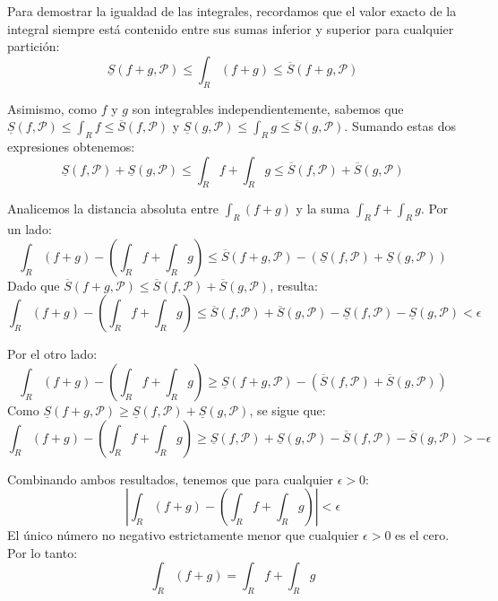 \documentclass[11pt,letterpaper]{article}
\begin{document}
Para demostrar la igualdad de las integrales, recordamos que el valor exacto de la integral siempre está contenido entre sus sumas inferior y superior para cualquier partición:
\begin{equation*}
\underline{S}(f+g,\mathcal{P}) \le \int_{R}(f+g) \le \overline{S}(f+g,\mathcal{P})
\end{equation*}

Asimismo, como $f$ y $g$ son integrables independientemente, sabemos que $\underline{S}(f,\mathcal{P}) \le \int_{R}f \le \overline{S}(f,\mathcal{P})$ y $\underline{S}(g,\mathcal{P}) \le \int_{R}g \le \overline{S}(g,\mathcal{P})$. Sumando estas dos expresiones obtenemos:
\begin{equation*}
\underline{S}(f,\mathcal{P}) + \underline{S}(g,\mathcal{P}) \le \int_{R}f + \int_{R}g \le \overline{S}(f,\mathcal{P}) + \overline{S}(g,\mathcal{P})
\end{equation*}

Analicemos la distancia absoluta entre $\int_{R}(f+g)$ y la suma $\int_{R}f + \int_{R}g$. 
Por un lado:
\begin{equation*}
\int_{R}(f+g) - \left(\int_{R}f + \int_{R}g\right) \le \overline{S}(f+g,\mathcal{P}) - (\underline{S}(f,\mathcal{P}) + \underline{S}(g,\mathcal{P}))
\end{equation*}
Dado que $\overline{S}(f+g,\mathcal{P}) \le \overline{S}(f,\mathcal{P}) + \overline{S}(g,\mathcal{P})$, resulta:
\begin{equation*}
\int_{R}(f+g) - \left(\int_{R}f + \int_{R}g\right) \le \overline{S}(f,\mathcal{P}) + \overline{S}(g,\mathcal{P}) - \underline{S}(f,\mathcal{P}) - \underline{S}(g,\mathcal{P}) < \epsilon
\end{equation*}

Por el otro lado:
\begin{equation*}
\int_{R}(f+g) - \left(\int_{R}f + \int_{R}g\right) \ge \underline{S}(f+g,\mathcal{P}) - (\overline{S}(f,\mathcal{P}) + \overline{S}(g,\mathcal{P}))
\end{equation*}
Como $\underline{S}(f+g,\mathcal{P}) \ge \underline{S}(f,\mathcal{P}) + \underline{S}(g,\mathcal{P})$, se sigue que:
\begin{equation*}
\int_{R}(f+g) - \left(\int_{R}f + \int_{R}g\right) \ge \underline{S}(f,\mathcal{P}) + \underline{S}(g,\mathcal{P}) - \overline{S}(f,\mathcal{P}) - \overline{S}(g,\mathcal{P}) > -\epsilon
\end{equation*}

Combinando ambos resultados, tenemos que para cualquier $\epsilon > 0$:
\begin{equation*}
\left| \int_{R}(f+g) - \left(\int_{R}f + \int_{R}g\right) \right| < \epsilon
\end{equation*}
El único número no negativo estrictamente menor que cualquier $\epsilon > 0$ es el cero. Por lo tanto:
\begin{equation*}
\int_{R}(f+g) = \int_{R}f + \int_{R}g
\end{equation*}
\end{document}
